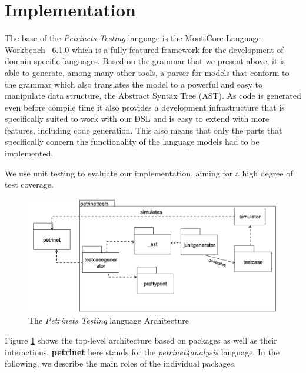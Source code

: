 %
\section{Implementation}\label{sec:implementation}


The base of the \emph{Petrinets Testing} language is the MontiCore Language Workbench~\cite{rumpe2017monticore} 6.1.0 which is a fully featured framework for the development of domain-specific languages. Based on the grammar that we present above, it is able to generate, among many other tools, a parser for models that conform to the grammar which also translates the model to a powerful and easy to manipulate data structure, the Abstract Syntax Tree (AST).
As code is generated even before compile time it also provides a development infrastructure that is specifically suited to work with our DSL and is easy to extend with more features, including code generation.
This also means that only the parts that specifically concern the functionality of the language models had to be implemented.

We use unit testing to evaluate our implementation, aiming for a high degree of test coverage.


\begin{figure}
  \centering
  \includegraphics[width=\textwidth]{src/pic/architecture.png}
  \caption{The \emph{Petrinets Testing} language Architecture}
  \label{fig:architecture}
\end{figure}


Figure \ref{fig:architecture} shows the top-level architecture based on packages as well as their interactions. \textbf{petrinet} here stands for the \emph{petrinet4analysis} language. In the following, we describe the main roles of the individual packages.


